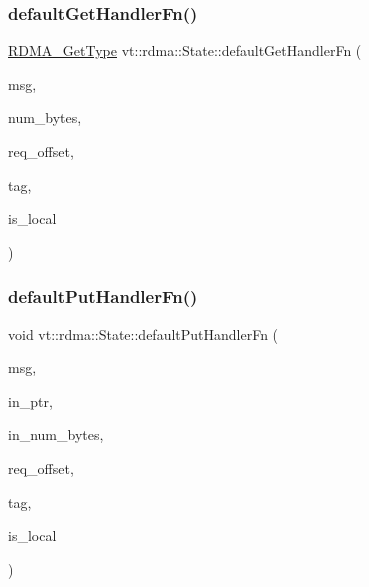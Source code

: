 \subsubsection{\texorpdfstring{default\+Get\+Handler\+Fn()}{defaultGetHandlerFn()}}
{\footnotesize\ttfamily \hyperlink{namespacevt_a1cab7f4860f65a49ad2c042d6240f288}{R\+D\+M\+A\+\_\+\+Get\+Type} vt\+::rdma\+::\+State\+::default\+Get\+Handler\+Fn (\begin{DoxyParamCaption}\item[{\hyperlink{structvt_1_1rdma_1_1_state_message}{State\+Message}$<$ \hyperlink{structvt_1_1rdma_1_1_state}{State} $>$ $\ast$}]{msg,  }\item[{\hyperlink{namespacevt_aab8d55968084610ce3b17057981e9300}{Byte\+Type}}]{num\+\_\+bytes,  }\item[{\hyperlink{namespacevt_aab8d55968084610ce3b17057981e9300}{Byte\+Type}}]{req\+\_\+offset,  }\item[{\hyperlink{namespacevt_a84ab281dae04a52a4b243d6bf62d0e52}{Tag\+Type}}]{tag,  }\item[{bool}]{is\+\_\+local }\end{DoxyParamCaption})\hspace{0.3cm}{\ttfamily [static]}}

\mbox{\label{structvt_1_1rdma_1_1_state_a529be951a782923d38158859111897cd}} 
\subsubsection{\texorpdfstring{default\+Put\+Handler\+Fn()}{defaultPutHandlerFn()}}
{\footnotesize\ttfamily void vt\+::rdma\+::\+State\+::default\+Put\+Handler\+Fn (\begin{DoxyParamCaption}\item[{\hyperlink{structvt_1_1rdma_1_1_state_message}{State\+Message}$<$ \hyperlink{structvt_1_1rdma_1_1_state}{State} $>$ $\ast$}]{msg,  }\item[{\hyperlink{namespacevt_aab05b4a584f7ee835a6d0f66915cf59b}{R\+D\+M\+A\+\_\+\+Ptr\+Type}}]{in\+\_\+ptr,  }\item[{\hyperlink{namespacevt_aab8d55968084610ce3b17057981e9300}{Byte\+Type}}]{in\+\_\+num\+\_\+bytes,  }\item[{\hyperlink{namespacevt_aab8d55968084610ce3b17057981e9300}{Byte\+Type}}]{req\+\_\+offset,  }\item[{\hyperlink{namespacevt_a84ab281dae04a52a4b243d6bf62d0e52}{Tag\+Type}}]{tag,  }\item[{bool}]{is\+\_\+local }\end{DoxyParamCaption})\hspace{0.3cm}{\ttfamily [static]}}

